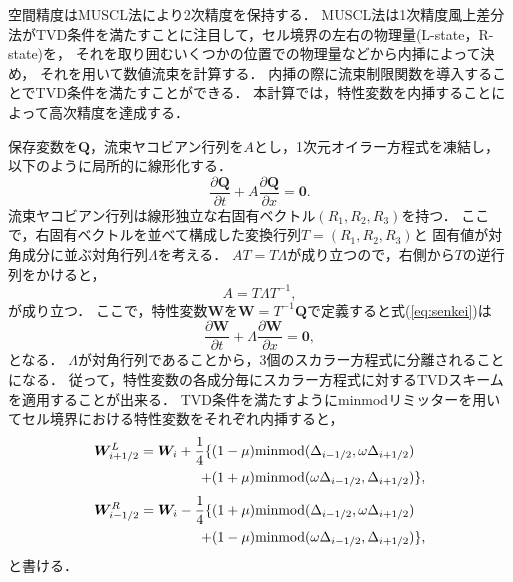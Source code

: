 空間精度はMUSCL法により2次精度を保持する\cite{van1979towards}．
MUSCL法は1次精度風上差分法がTVD条件を満たすことに注目して，セル境界の左右の物理量(L-state，R-state)を，
それを取り囲むいくつかの位置での物理量などから内挿によって決め，
それを用いて数値流束を計算する．
内挿の際に流束制限関数を導入することでTVD条件を満たすことができる．
本計算では，特性変数を内挿することによって高次精度を達成する．

保存変数を$\bm{Q}$，流束ヤコビアン行列を$A$とし，1次元オイラー方程式を凍結し，以下のように局所的に線形化する．
\begin{equation}
   \dfrac{\partial \bm{Q}}{\partial t}
  +A \dfrac{\partial \bm{Q}}{\partial x}
  =\bm{0}.
  \label{eq:senkei}
\end{equation}
流束ヤコビアン行列は線形独立な右固有ベクトル$(R_1,R_2,R_3)$を持つ．
ここで，右固有ベクトルを並べて構成した変換行列$T=(R_1,R_2,R_3)$と
固有値が対角成分に並ぶ対角行列$\Lambda$を考える．
$AT=T\Lambda$が成り立つので，右側から$T$の逆行列をかけると，
\begin{equation}
  A=T \Lambda T^{-1},
\end{equation}
が成り立つ．
ここで，特性変数$\bm{W}$を$\bm{W}=T^{-1}\bm{Q}$で定義すると式(\ref{eq:senkei})は
\begin{equation}
   \dfrac{\partial \bm{W}}{\partial t}
  +\Lambda \dfrac{\partial \bm{W}}{\partial x}
  =\bm{0},
\end{equation}
となる．
$\Lambda$が対角行列であることから，3個のスカラー方程式に分離されることになる．
従って，特性変数の各成分毎にスカラー方程式に対するTVDスキームを適用することが出来る．
TVD条件を満たすようにminmodリミッターを用いてセル境界における特性変数をそれぞれ内挿すると，
\begin{equation}
\begin{split}
  {\bm W}_{i+1/2}^L = {\bm W}_i+\dfrac{1}{4} \{ (1- \mu)&{\rm minmod}(\Delta_{i-1/2},\omega \Delta_{i+1/2}) \\
  + (1+ \mu)&{\rm minmod}(\omega \Delta_{i-1/2},\Delta_{i+1/2}) \},
\end{split}
\end{equation}
\begin{equation}
\begin{split}
  {\bm W}_{i-1/2}^R={\bm W}_i-\dfrac{1}{4} \{ (1+ \mu)&{\rm minmod}(\Delta_{i-1/2},\omega \Delta_{i+1/2}) \\
  + (1- \mu)&{\rm minmod}(\omega \Delta_{i-1/2},\Delta_{i+1/2}) \},
\end{split}
\end{equation}
と書ける．
